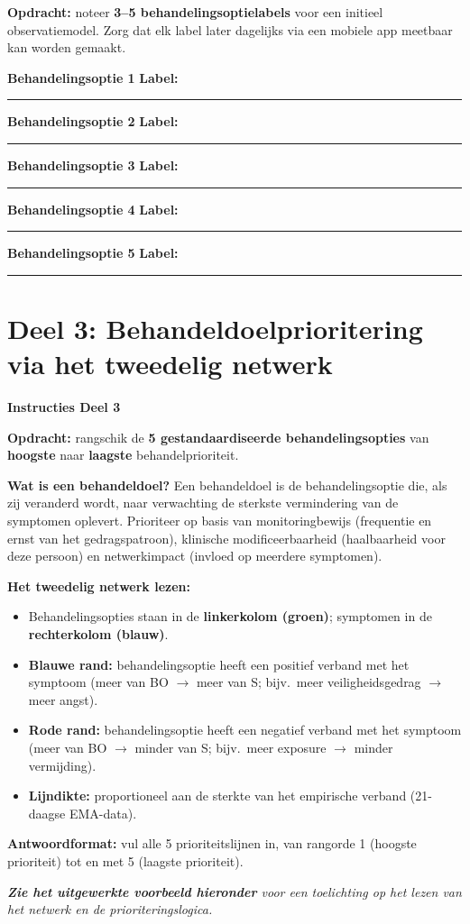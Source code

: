 \documentclass[11pt,a4paper]{article}
\newcommand{\behandelingsoptieslot}[1]{%
\vspace{0.25em}\noindent
\begin{tcolorbox}[colback=SoftBG,colframe=BorderGrey,boxrule=0.4pt,arc=1.5mm,left=8pt,right=8pt,top=5pt,bottom=5pt]%
\small\textbf{\color{SlateMid}Behandelingsoptie #1}\hspace{1em}%
\textbf{Label:}\hspace{0.5em}\rule{0.56\linewidth}{0.25pt}%
\end{tcolorbox}%
}
\begin{document}
\begin{responsebox}[title={Uw antwoord -- Deel 2}]
\small\textbf{Opdracht:} noteer \textbf{3--5 behandelingsoptielabels} voor een initieel observatiemodel.
Zorg dat elk label later dagelijks via een mobiele app meetbaar kan worden gemaakt.

\behandelingsoptieslot{1}
\behandelingsoptieslot{2}
\behandelingsoptieslot{3}
\behandelingsoptieslot{4}
\behandelingsoptieslot{5}
\end{responsebox}

\vspace{0.6em}
\newpage


\section{Deel 3: Behandeldoelprioritering via het tweedelig netwerk}

\begin{tcolorbox}[colback=yellow!5,colframe=GoldAmber,arc=2.5mm,boxrule=0.9pt,
  left=10pt,right=10pt,top=9pt,bottom=9pt]
\textbf{\color{GoldAmber}Instructies Deel 3}

\smallskip\small
\textbf{Opdracht:} rangschik de \textbf{5 gestandaardiseerde behandelingsopties} van
\textbf{hoogste} naar \textbf{laagste} behandelprioriteit.

\textbf{Wat is een behandeldoel?}
Een behandeldoel is de behandelingsoptie die, als zij veranderd wordt, naar verwachting de
sterkste vermindering van de symptomen oplevert. Prioriteer op basis van monitoringbewijs
(frequentie en ernst van het gedragspatroon), klinische modificeerbaarheid
(haalbaarheid voor deze persoon) en netwerkimpact (invloed op meerdere symptomen).

\textbf{Het tweedelig netwerk lezen:}
\begin{itemize}[topsep=2pt,itemsep=1pt]
\item Behandelingsopties staan in de \textbf{linkerkolom (groen)}; symptomen in de \textbf{rechterkolom (blauw)}.
\item \textbf{Blauwe rand:} behandelingsoptie heeft een positief verband met het symptoom
(meer van BO $\rightarrow$ meer van S; bijv.\ meer veiligheidsgedrag $\rightarrow$ meer angst).
\item \textbf{Rode rand:} behandelingsoptie heeft een negatief verband met het symptoom
(meer van BO $\rightarrow$ minder van S; bijv.\ meer exposure $\rightarrow$ minder vermijding).
\item \textbf{Lijndikte:} proportioneel aan de sterkte van het empirische verband
(21-daagse EMA-data).
\end{itemize}

\textbf{Antwoordformat:} vul alle 5 prioriteitslijnen in, van rangorde 1 (hoogste prioriteit)
tot en met 5 (laagste prioriteit).

\medskip
\textit{\textbf{Zie het uitgewerkte voorbeeld hieronder} voor een toelichting op het lezen van het netwerk en de prioriteringslogica.}
\end{tcolorbox}
\end{document}

